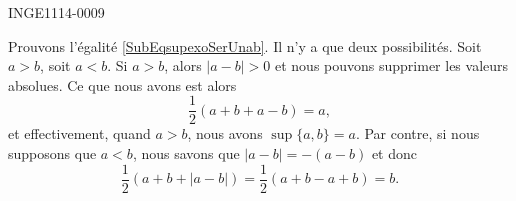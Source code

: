 

\begin{corrige}{INGE1114-0009}

	Prouvons l'égalité \eqref{SubEqsupexoSerUnab}. Il n'y a que deux possibilités. Soit $a>b$, soit $a<b$. Si $a>b$, alors $| a-b |>0$ et nous pouvons supprimer les valeurs absolues. Ce que nous avons est alors
	\begin{equation}
		\frac{ 1 }{2}(a+b+a-b)=a,
	\end{equation}
	et effectivement, quand $a>b$, nous avons $\sup\{ a,b \}=a$. Par contre, si nous supposons que $a<b$, nous savons que $| a-b |=-(a-b)$ et donc
	\begin{equation}
		\frac{ 1 }{2}(a+b+| a-b |)=\frac{ 1 }{2}(a+b-a+b)=b.
	\end{equation}

\end{corrige}
